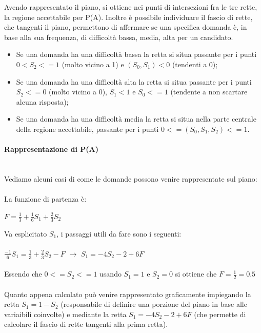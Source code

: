 \noindent Avendo rappresentato il piano, si ottiene nei punti di intersezioni fra le tre rette, la regione accettabile per P(A). Inoltre \`e possibile individuare il fascio di rette, che tangenti il piano, permettono di affermare se una specifica domanda \`e, in base alla sua frequenza, di difficolt\`a bassa, media, alta per un candidato.
\begin{itemize}
\item Se una domanda ha una difficolt\`a bassa la retta si situa passante per i punti $0<S_2<=1$ (molto vicino a 1) e $(S_0, S_1)<0$ (tendenti a 0);
\item Se una domanda ha una difficolt\`a alta la retta si situa passante per i punti $S_2<=0$ (molto vicino a 0), $S_1<1$ e $S_0<=1$ (tendente a non scartare alcuna risposta);
\item Se una domanda ha una difficolt\`a media la retta si situa nella parte centrale della regione accettabile, passante per i punti $0<=(S_0, S_1, S_2)<=1$.\end{itemize}

\paragraph{Rappresentazione di P(A)}\mbox\\\\

\noindent Vediamo alcuni casi di come le domande possono venire rappresentate sul piano:\\\\
La funzione di partenza \`e:
\begin{center}$F=\frac{1}{3}+\frac{1}{6}S_1+\frac{2}{3}S_2$\end{center}
Va esplicitato $S_1$, i passaggi utili da fare sono i seguenti:\\\\
$\frac{-1}{6}S_1=\frac{1}{3}+\frac{2}{3}S_2-F$ $\rightarrow$ $S_1=-4S_2-2+6F$\\\\
Essendo  che $0<=S_2<=1$ usando $S_1=1$ e $S_2=0$ si ottiene che $F=\frac{1}{2}=0.5$\\
\\
Quanto appena calcolato pu\`o venire rappresentato graficamente impiegando la retta $S_1=1-S_2$ (responsabile di definire una porzione del piano in base alle variaibili coinvolte) e mediante la retta $S_1=-4S_2-2+6F$ (che permette di calcolare il fascio di rette tangenti alla prima retta). \\

